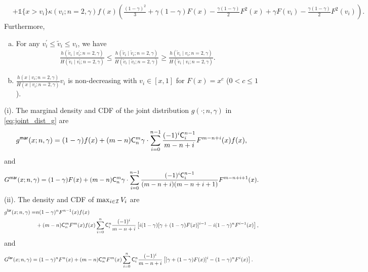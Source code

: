 \begin{corollary}
{{\begin{align*}
 & + \mathds{1}\{x > v_i\} \kappa(v_i;n = 2,\gamma) f(x)\left(\frac{(1-\gamma)^2}{3} + \gamma(1-\gamma) F\left(x\right) - \frac{\gamma(1-\gamma)}{2} F^2\left(x\right) + \gamma F\left(v_i\right) - \frac{\gamma (1-\gamma)}{2} F^2\left(v_i\right) \right). 
\end{align*}}
}
Furthermore,
\begin{enumerate}[(a)]
     \item For any $v_i^\prime\leq \tilde{v}_i\leq v_i$, we have
\begin{align*}  \frac{h(\tilde{v}_i\mid v_i^\prime;n=2,\gamma)}{H(\tilde{v}_i\mid v_i^\prime;n=2,\gamma)} 
\leq \frac{h(\tilde{v}_i\mid \tilde{v}_i;n=2,\gamma)}{H(\tilde{v}_i\mid \tilde{v}_i;n=2,\gamma)} 
\geq 
 \frac{h(\tilde{v}_i\mid v_i;n=2,\gamma)}{H(\tilde{v}_i\mid v_i;n=2,\gamma)}.
\end{align*}
\item $\frac{h(x\mid v_i;n=2,\gamma)}{H(x\mid v_i;n=2,\gamma)}v_i$ is non-decreasing with $v_i \in [x,1]$ for $F(x) = x^c$ ($0< c\leq 1$).
\end{enumerate}

\end{corollary}




\begin{lemma}
\label{lem:marginals_joint_g} (i). The marginal density and CDF of the joint distribution $g(\cdot;n,\gamma)$ in \eqref{eq:joint_dist_g} are 
\begin{align*}
    g^{\mathsf{mar}}(x ;n,\gamma)
 = (1-\gamma)f(x) + (m-n)\mathsf{C}^m_n\gamma \cdot \sum_{i=0}^{n-1}\frac{(-1)^i\mathsf{C}^{n-1}_i}{m-n+i} F^{m-n+i}(x)f(x),
\end{align*}
and 
  \begin{align*}
   G^{\mathsf{mar}}(x; n,\gamma)  = (1-\gamma)F(x) + (m-n)\mathsf{C}^m_n\gamma \cdot \sum_{i=0}^{n-1}\frac{(-1)^i\mathsf{C}^{n-1}_i}{(m-n+i)(m-n+i+1)} F^{m-n+i+1}(x).
 \end{align*}
(ii). The density and CDF of $\max_{i\in\mathcal{I}}V_i$
are  
\begin{align*}
    g^{\mathsf{lar}}(x;n,\gamma) =& n(1-\gamma)^n F^{n-1}(x)f(x)\\
    &
   +(m-n)\mathsf{C}^m_nF^m(x)f(x)\sum_{i=0}^n\mathsf{C}^n_i\frac{(-1)^i}{m-n+i}\left[i (1-\gamma)[\gamma + (1-\gamma)F(x)]^{i-1}-i(1-\gamma)^nF^{i-1}(x) \right],
\end{align*}
and 
 \begin{align*}
  & G^{\mathsf{lar}}(x; n,\gamma) =(1-\gamma)^nF^n(x) + (m-n)\mathsf{C}^m_nF^m(x)\sum_{i=0}^n\mathsf{C}^n_i\frac{(-1)^i}{m-n+i}\left[[\gamma + (1-\gamma)F(x)]^i -(1-\gamma)^nF^i(x)\right].
 \end{align*}
\end{lemma}



